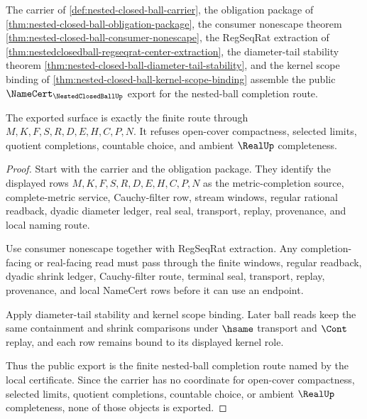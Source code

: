 \begin{theorem}
\label{thm:nested-closed-ball-public-namecert-export}
The carrier of \autoref{def:nested-closed-ball-carrier}, the obligation package of \autoref{thm:nested-closed-ball-obligation-package}, the consumer nonescape theorem \autoref{thm:nested-closed-ball-consumer-nonescape}, the RegSeqRat extraction of \autoref{thm:nestedclosedball-regseqrat-center-extraction}, the diameter-tail stability theorem \autoref{thm:nested-closed-ball-diameter-tail-stability}, and the kernel scope binding of \autoref{thm:nested-closed-ball-kernel-scope-binding} assemble the public $\NameCert_{\NestedClosedBallUp}$ export for the nested-ball completion route.

The exported surface is exactly the finite route through $M,K,F,S,R,D,E,H,C,P,N$. It refuses open-cover compactness, selected limits, quotient completions, countable choice, and ambient $\RealUp$ completeness.
\end{theorem}
\begin{proof}
Start with the carrier and the obligation package. They identify the displayed rows $M,K,F,S,R,D,E,H,C,P,N$ as the metric-completion source, complete-metric service, Cauchy-filter row, stream windows, regular rational readback, dyadic diameter ledger, real seal, transport, replay, provenance, and local naming route.

Use consumer nonescape together with RegSeqRat extraction. Any completion-facing or real-facing read must pass through the finite windows, regular readback, dyadic shrink ledger, Cauchy-filter route, terminal seal, transport, replay, provenance, and local NameCert rows before it can use an endpoint.

Apply diameter-tail stability and kernel scope binding. Later ball reads keep the same containment and shrink comparisons under $\hsame$ transport and $\Cont$ replay, and each row remains bound to its displayed kernel role.

Thus the public export is the finite nested-ball completion route named by the local certificate. Since the carrier has no coordinate for open-cover compactness, selected limits, quotient completions, countable choice, or ambient $\RealUp$ completeness, none of those objects is exported.
\end{proof}

